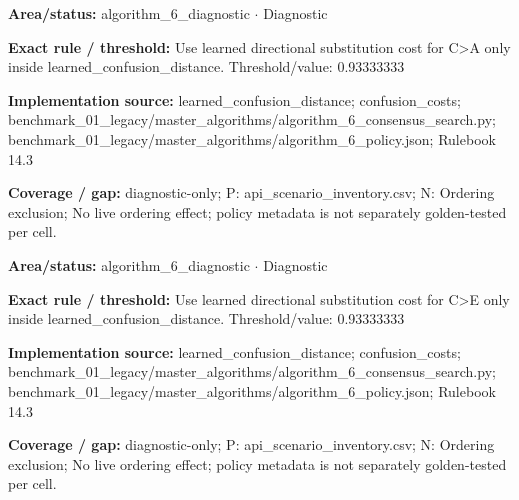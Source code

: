 \begin{tcolorbox}[enhanced,breakable,colback=white,colframe=Muted!45,boxrule=0.45pt,arc=1.5pt,left=6pt,right=6pt,top=5pt,bottom=5pt,title={\texttt{A6-LEARNED-SUBSTITUTION-C-A}},title after break={\texttt{A6-LEARNED-SUBSTITUTION-C-A}\ (continued)},fonttitle=\headingfont\bfseries\color{Navy},coltitle=Navy]
\textbf{Area/status:} algorithm\_\allowbreak{}6\_\allowbreak{}diagnostic $\boldsymbol{\cdot}$ Diagnostic\par
\smallskip
\textbf{Exact rule / threshold:} Use learned directional substitution cost for C>A only inside learned\_\allowbreak{}confusion\_\allowbreak{}distance. Threshold/\allowbreak{}value: 0.93333333\par
\smallskip
\textbf{Implementation source:} learned\_\allowbreak{}confusion\_\allowbreak{}distance; confusion\_\allowbreak{}costs; benchmark\_\allowbreak{}01\_\allowbreak{}legacy/\allowbreak{}master\_\allowbreak{}algorithms/\allowbreak{}algorithm\_\allowbreak{}6\_\allowbreak{}consensus\_\allowbreak{}search.py; benchmark\_\allowbreak{}01\_\allowbreak{}legacy/\allowbreak{}master\_\allowbreak{}algorithms/\allowbreak{}algorithm\_\allowbreak{}6\_\allowbreak{}policy.json; Rulebook 14.3\par
\smallskip
\textbf{Coverage / gap:} diagnostic-only; P: api\_\allowbreak{}scenario\_\allowbreak{}inventory.csv; N: Ordering exclusion; No live ordering effect; policy metadata is not separately golden-tested per cell.
\end{tcolorbox}
\begin{tcolorbox}[enhanced,breakable,colback=white,colframe=Muted!45,boxrule=0.45pt,arc=1.5pt,left=6pt,right=6pt,top=5pt,bottom=5pt,title={\texttt{A6-LEARNED-SUBSTITUTION-C-E}},title after break={\texttt{A6-LEARNED-SUBSTITUTION-C-E}\ (continued)},fonttitle=\headingfont\bfseries\color{Navy},coltitle=Navy]
\textbf{Area/status:} algorithm\_\allowbreak{}6\_\allowbreak{}diagnostic $\boldsymbol{\cdot}$ Diagnostic\par
\smallskip
\textbf{Exact rule / threshold:} Use learned directional substitution cost for C>E only inside learned\_\allowbreak{}confusion\_\allowbreak{}distance. Threshold/\allowbreak{}value: 0.93333333\par
\smallskip
\textbf{Implementation source:} learned\_\allowbreak{}confusion\_\allowbreak{}distance; confusion\_\allowbreak{}costs; benchmark\_\allowbreak{}01\_\allowbreak{}legacy/\allowbreak{}master\_\allowbreak{}algorithms/\allowbreak{}algorithm\_\allowbreak{}6\_\allowbreak{}consensus\_\allowbreak{}search.py; benchmark\_\allowbreak{}01\_\allowbreak{}legacy/\allowbreak{}master\_\allowbreak{}algorithms/\allowbreak{}algorithm\_\allowbreak{}6\_\allowbreak{}policy.json; Rulebook 14.3\par
\smallskip
\textbf{Coverage / gap:} diagnostic-only; P: api\_\allowbreak{}scenario\_\allowbreak{}inventory.csv; N: Ordering exclusion; No live ordering effect; policy metadata is not separately golden-tested per cell.
\end{tcolorbox}
